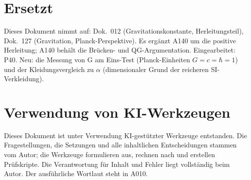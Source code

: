 \section{Ersetzt}

Dieses Dokument nimmt auf: Dok.~012 (Gravitationskonstante, Herleitungsteil),
Dok.~127 (Gravitation, Planck-Perspektive). Es ergänzt A140 um die positive
Herleitung; A140 behält die Brücken- und QG-Argumentation.
Eingearbeitet: P40. Neu: die Messung von G am Eins-Test (Planck-Einheiten $G=c=\hbar=1$) und der Kleidungsvergleich zu $\alpha$ (dimensionaler Grund der reicheren SI-Verkleidung).

\section{Verwendung von KI-Werkzeugen}

Dieses Dokument ist unter Verwendung KI-gestützter Werkzeuge entstanden. Die
Fragestellungen, die Setzungen und alle inhaltlichen Entscheidungen stammen vom
Autor; die Werkzeuge formulieren aus, rechnen nach und erstellen Prüfskripte.
Die Verantwortung für Inhalt und Fehler liegt vollständig beim Autor. Der
ausführliche Wortlaut steht in A010.

